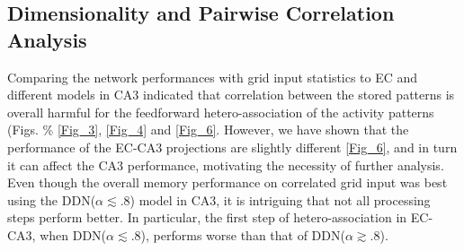\documentclass[utf8]{frontiersSCNS} %
\begin{document}


\subsection{Dimensionality and Pairwise Correlation Analysis}

Comparing the network performances with grid input statistics to EC and
different models in CA3 indicated that correlation between the stored patterns is overall harmful for the feedforward hetero-association of the activity patterns (Figs. \% \ref{Fig_3}, \ref{Fig_4} and \ref{Fig_6}. 
%
However, we have shown that the performance of the EC-CA3 projections are slightly different \ref{Fig_6}, and in turn it can affect the CA3 performance, motivating the necessity of further analysis. 
%
Even though the overall memory performance on correlated grid input
was best using the DDN($\alpha \lesssim .8$) model in CA3, it is intriguing that not all processing steps perform better. In particular, the first step of hetero-association in EC-CA3, when DDN($\alpha \lesssim .8$), performs worse than that of DDN($\alpha \gtrsim .8$).
\end{document}
